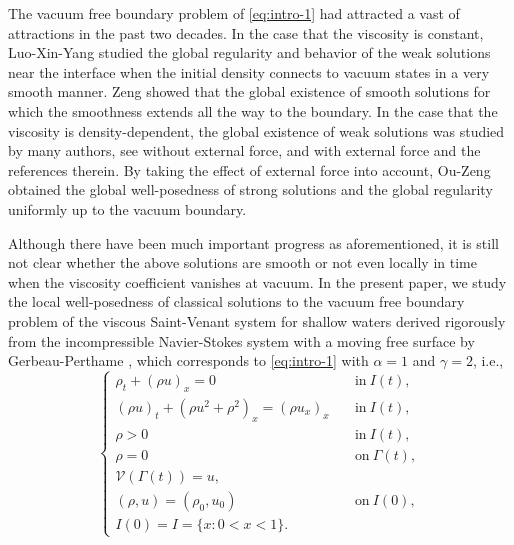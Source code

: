 \documentclass[11pt, reqno]{amsart}
\numberwithin{equation}{section}
\begin{document}
The vacuum free boundary problem
of \eqref{eq:intro-1} had attracted a vast of attractions in the past two decades.
In the case that the viscosity is constant, Luo-Xin-Yang \cite{MR1766564} studied the global regularity and behavior of the weak solutions near the interface
when the initial density connects to vacuum states in a very smooth manner.  Zeng \cite{MR3303172} showed that the global existence of smooth solutions for which the smoothness extends all the way to
the boundary. In the case that the viscosity is density-dependent, the global existence of weak solutions was studied by many authors, see \cite{MR1990849} without external force, and \cite{MR2771263, MR2259332, MR2068308} with external force and the references therein.
By taking the effect of external force into account, Ou-Zeng \cite{MR3397339} obtained the global well-posedness of strong solutions and the global regularity uniformly up to the vacuum boundary.


Although there have been much important progress as aforementioned, it is still not clear whether the above solutions are smooth or not even locally in time when the viscosity coefficient vanishes at vacuum. In the present paper, we study the local well-posedness of classical solutions to the vacuum free boundary problem of the viscous Saint-Venant system
for shallow waters derived rigorously from the incompressible
Navier-Stokes system with a moving free surface by Gerbeau-Perthame \cite{MR1821555}, which corresponds to \eqref{eq:intro-1} with \(\alpha=1\) and \(\gamma=2\), i.e.,
\begin{equation}\label{eq:intro-2}
\begin{cases}
\rho_t+(\rho
u)_x=0 &\quad \text{in}\ I(t),\\
(\rho u)_t+(\rho u^2+\rho^2)_x=(\rho u_x)_x &\quad \text{in}\ I(t),\\
\rho>0 &\quad \text{in}\ I(t),\\
\rho=0 &\quad \text{on}\ \Gamma(t),\\
\mathcal{V}(\Gamma(t))=u,\\
(\rho,u)=(\rho_0,u_0) &\quad \text{on}\ I(0),\\
I(0)=I=\{x: 0<x<1\}.
\end{cases}
\end{equation}
\end{document}
